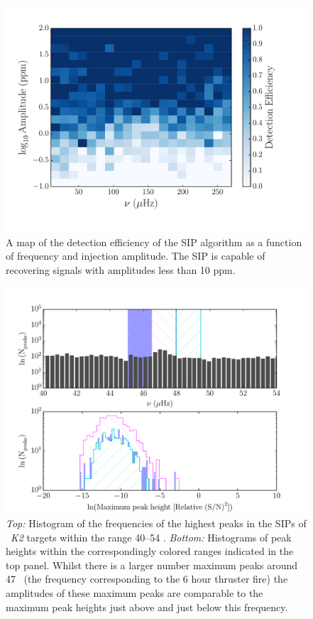 \begin{figure}[h]
\begin{center}
\includegraphics[width=6in, clip=true]{figures/hist.pdf}
\caption{A map of the detection efficiency of the SIP algorithm as a function
of frequency and injection amplitude. The SIP is capable of recovering
signals with amplitudes less than 10 ppm.}
\label{fig:map}
\end{center}
\end{figure}

\begin{figure}[h]
\begin{center}
\includegraphics[width=6in, clip=true]{figures/sip_hist.pdf}
\caption{{\it Top:} Histogram of the frequencies of the highest peaks in the
	SIPs of \nGO\ {\it K2} targets within the range 40--54 \uHz.
	{\it Bottom:} Histograms of peak heights within the correspondingly
	colored ranges indicated in the top panel.
	Whilst there is a larger number maximum peaks around 47 \uHz\ (the
	frequency corresponding to the 6 hour thruster fire) the amplitudes of
	these maximum peaks are comparable to the maximum peak heights just
	above and just below this frequency.}
\label{fig:sip_hist}
\end{center}
\end{figure}

